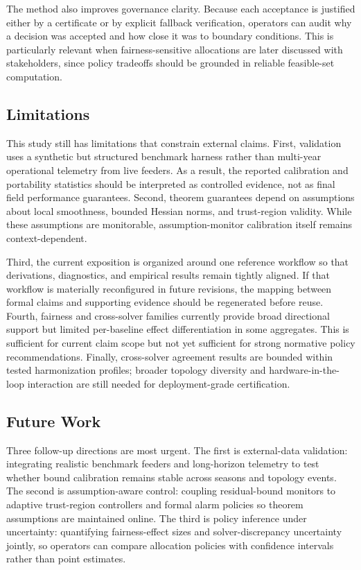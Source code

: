 \documentclass{article} %
\begin{document}
The method also improves governance clarity. Because each acceptance is justified either by a certificate or by explicit fallback verification, operators can audit why a decision was accepted and how close it was to boundary conditions. This is particularly relevant when fairness-sensitive allocations are later discussed with stakeholders, since policy tradeoffs should be grounded in reliable feasible-set computation.

\subsection{Limitations}
This study still has limitations that constrain external claims. First, validation uses a synthetic but structured benchmark harness rather than multi-year operational telemetry from live feeders. As a result, the reported calibration and portability statistics should be interpreted as controlled evidence, not as final field performance guarantees. Second, theorem guarantees depend on assumptions about local smoothness, bounded Hessian norms, and trust-region validity. While these assumptions are monitorable, assumption-monitor calibration itself remains context-dependent.

Third, the current exposition is organized around one reference workflow so that derivations, diagnostics, and empirical results remain tightly aligned. If that workflow is materially reconfigured in future revisions, the mapping between formal claims and supporting evidence should be regenerated before reuse. Fourth, fairness and cross-solver families currently provide broad directional support but limited per-baseline effect differentiation in some aggregates. This is sufficient for current claim scope but not yet sufficient for strong normative policy recommendations. Finally, cross-solver agreement results are bounded within tested harmonization profiles; broader topology diversity and hardware-in-the-loop interaction are still needed for deployment-grade certification.

\subsection{Future Work}
Three follow-up directions are most urgent. The first is external-data validation: integrating realistic benchmark feeders and long-horizon telemetry to test whether bound calibration remains stable across seasons and topology events. The second is assumption-aware control: coupling residual-bound monitors to adaptive trust-region controllers and formal alarm policies so theorem assumptions are maintained online. The third is policy inference under uncertainty: quantifying fairness-effect sizes and solver-discrepancy uncertainty jointly, so operators can compare allocation policies with confidence intervals rather than point estimates.
\end{document}
